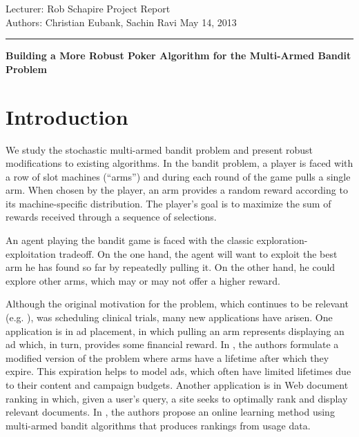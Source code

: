 \documentclass[12pt]{article}
\begin{document}
\thispagestyle{empty}


\noindent
Lecturer: Rob Schapire   %
\hfill
Project Report              %
\\
Authors: Christian Eubank, Sachin Ravi                %
\hfill
May 14, 2013           %

\noindent
\rule{\textwidth}{1pt}

\begin{center}
\bf\large Building a More Robust Poker Algorithm for the Multi-Armed Bandit Problem
\end{center}

\medskip

\section{Introduction}

We study the stochastic multi-armed bandit problem and present robust modifications to existing algorithms. In the bandit problem, a player is  
faced with a row of slot machines (``arms'') and during each round of the game pulls a single arm.  When chosen by the player, an arm provides a random reward according to its machine-specific distribution. The player's goal is to maximize the sum of rewards received through a
sequence of selections.  

An agent playing the bandit game is faced with the classic exploration-exploitation tradeoff.  On the one hand, the agent will want to 
exploit the best arm he has found so far by repeatedly pulling it. On the other hand, he could explore other arms,
which may or may not offer a higher reward.

Although the original motivation for the problem, which continues to be relevant (e.g. \cite{Cassell}), was scheduling clinical trials, many 
new applications have arisen.  One application is in ad placement, in which pulling an arm represents displaying an ad which, in turn,
provides some financial reward.  In \cite{Chakrabarti}, the authors formulate a modified version
of the problem where arms have a lifetime after which they expire. This expiration helps to model ads, which often 
have limited lifetimes due to their content and campaign budgets.  Another application is in Web document ranking 
in which, given a user's query, a site seeks to optimally rank and display relevant documents.
In \cite{Radlinski}, the authors propose an online learning method using multi-armed bandit algorithms that produces rankings from usage data.   
\end{document}
